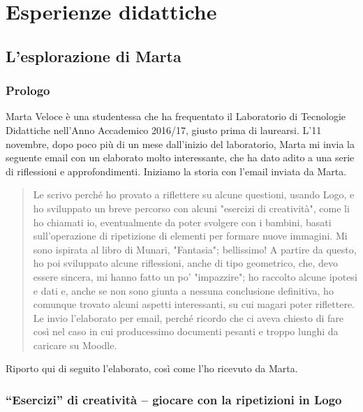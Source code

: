 \part{Esperienze didattiche} \label{parte:esperienze-didattiche}

\chapter{L'esplorazione di Marta} \label{cap:marta}

\section{Prologo}

Marta Veloce è una studentessa che ha frequentato il Laboratorio di Tecnologie
Didattiche nell'Anno Accademico 2016/17, giusto prima di laurearsi. L'11
novembre, dopo poco più di un mese dall'inizio del laboratorio, Marta mi
invia la seguente email con un elaborato molto interessante, che ha dato adito
a una serie di riflessioni e approfondimenti. Iniziamo la storia con l'email
inviata da Marta.

\begin{quote} Le scrivo perché ho provato a riflettere su alcune questioni,
	usando Logo, e ho sviluppato un breve percorso con alcuni "esercizi di
	creatività", come li ho chiamati io, eventualmente da poter svolgere
	con i bambini, basati sull'operazione di ripetizione di elementi per
	formare nuove immagini. Mi sono ispirata al libro di Munari\cite{Munari},
	"Fantasia"; bellissimo! A partire da questo, ho poi sviluppato alcune
	riflessioni, anche di tipo geometrico, che, devo essere sincera, mi
	hanno fatto un po' "impazzire"; ho raccolto alcune ipotesi e dati e,
	anche se non sono giunta a nessuna conclusione definitiva, ho comunque
	trovato alcuni aspetti interessanti, su cui magari poter riflettere. Le
	invio l'elaborato per email, perché ricordo che ci aveva chiesto di
	fare così nel caso in cui producessimo documenti pesanti e troppo
	lunghi da caricare su Moodle.    \end{quote}

Riporto qui di seguito l'elaborato, così come l'ho ricevuto da Marta.

\section{“Esercizi” di creatività – giocare con la ripetizioni in Logo}
\label{sez:esercizi-creativita}

